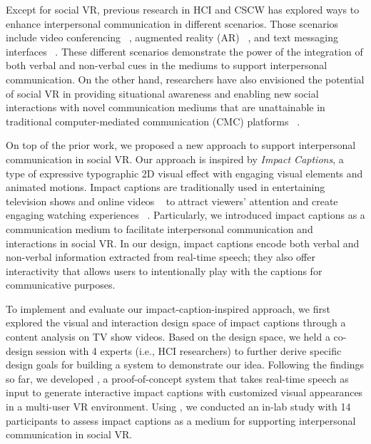Except for social VR, previous research in HCI and CSCW has explored ways to enhance interpersonal communication in different scenarios. Those scenarios include video conferencing ~\cite{liu2023visual, xia2023crosstalk}, augmented reality (AR) ~\cite{lee2023exploring, liao2022realitytalk, leong2022wemoji}, and text messaging interfaces ~\cite{aoki2022emoballoon}. 
These different scenarios demonstrate the power of the integration of both verbal and non-verbal cues in the mediums to support interpersonal communication. 
On the other hand, researchers have also envisioned the potential of social VR in providing situational awareness and enabling new social interactions with novel communication mediums that are unattainable in traditional computer-mediated communication (CMC) platforms ~\cite{mcveigh2021case, mcveigh2022beyond}. 

On top of the prior work, we proposed a new approach to support interpersonal communication in social VR. Our approach is inspired by \textit{Impact Captions}, a type of expressive typographic 2D visual effect with engaging visual elements and animated motions. Impact captions are traditionally used in entertaining television shows and online videos ~\cite{o2010japanese, sasamoto2014impact} to attract viewers' attention and create engaging watching experiences ~\cite{sasamoto2021hookability}. 
Particularly, we introduced impact captions as a communication medium to facilitate interpersonal communication and interactions in social VR. In our design, impact captions encode both verbal and non-verbal information extracted from real-time speech; they also offer interactivity that allows users to intentionally play with the captions for communicative purposes.

To implement and evaluate our impact-caption-inspired approach, we first explored the visual and interaction design space of impact captions through a content analysis on TV show videos.
Based on the design space, we held a co-design session with 4 experts (i.e., HCI researchers) to further derive specific design goals for building a system to demonstrate our idea.
Following the findings so far, we developed \system{}, a proof-of-concept system that takes real-time speech as input to generate interactive impact captions with customized visual appearances in a multi-user VR environment.
Using \system{}, we conducted an in-lab study with 14 participants to assess impact captions as a medium for supporting interpersonal communication in social VR. 

